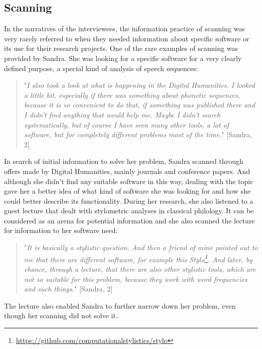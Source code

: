 \documentclass[12pt, a4paper, titlepage, oneside, abstract=true, toc=listof, toc=bibliography]{scrreprt}
\begin{document}
{%
\subsection{Scanning}
\label{sec:IP_Scanning}
In the narratives of the interviewees, the information practice of scanning was very rarely referred to when they needed information about specific software or its use for their research projects. 
One of the rare examples of scanning was provided by Sandra. She was looking for a specific software for a very clearly defined purpose, a special kind of analysis of speech sequences:

\begin{quotation}
"\textit{I also took a look at what is happening in the Digital Humanities. I looked a little bit, especially if there was something about phonetic sequences, because it is so convenient to do that, if something was published there and I didn't find anything that would help me. Maybe I didn't search systematically, but of course I have seen many other tools, a lot of software, but for completely different problems most of the time.}" [Sandra, 2]
\end{quotation}

In search of initial information to solve her problem, Sandra scanned through offers made by Digital Humanities, mainly journals and conference papers. And although she didn't find any suitable software in this way, dealing with the topic gave her a better idea of what kind of software she was looking for and how she could better describe its functionality. During her research, she also listened to a guest lecture that dealt with stylometric analyses in classical philology. It can be considered as an arena for potential information and she also scanned the lecture for information to her software need:

\begin{quotation}
"\textit{It is basically a stylistic question. And then a friend of mine pointed out to me that there are different software, for example this Stylo\footnote{\url{https://github.com/computationalstylistics/stylo}}. And later, by chance, through a lecture, that there are also other stylistic tools, which are not so suitable for this problem, because they work with word frequencies and such things.}" [Sandra, 2]
\end{quotation}

The lecture also enabled Sandra to further narrow down her problem, even though her scanning did not solve it.

}
\end{document}
